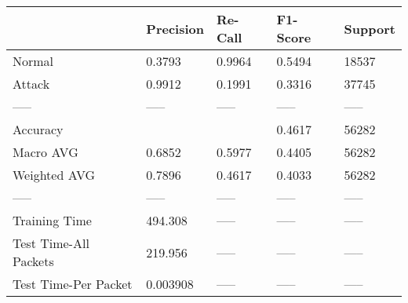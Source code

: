 \begin{tabular}{lllll}
\toprule
{} & Precision & Re-Call & F1-Score & Support \\
\midrule
Normal                &    0.3793 &  0.9964 &   0.5494 &   18537 \\
Attack                &    0.9912 &  0.1991 &   0.3316 &   37745 \\
-----                 &     ----- &   ----- &    ----- &   ----- \\
Accuracy              &           &         &   0.4617 &   56282 \\
Macro AVG             &    0.6852 &  0.5977 &   0.4405 &   56282 \\
Weighted AVG          &    0.7896 &  0.4617 &   0.4033 &   56282 \\
-----                 &     ----- &   ----- &    ----- &   ----- \\
Training Time         &   494.308 &   ----- &    ----- &   ----- \\
Test Time-All Packets &   219.956 &   ----- &    ----- &   ----- \\
Test Time-Per Packet  &  0.003908 &   ----- &    ----- &   ----- \\
\bottomrule
\end{tabular}
